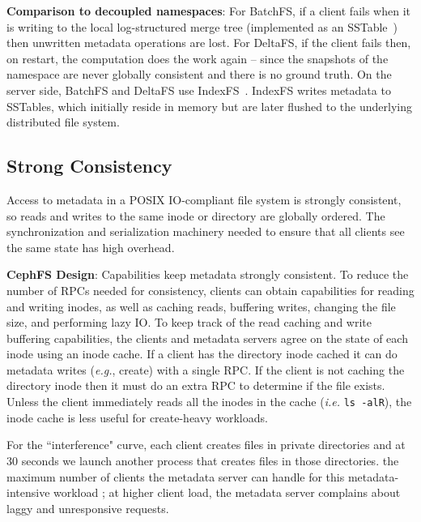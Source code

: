 \textbf{Comparison to decoupled namespaces}: For BatchFS, if a client fails
when it is writing to the local log-structured merge tree (implemented as an
SSTable~\cite{ren:atc2013-tablefs}) then unwritten metadata operations are
lost. For DeltaFS, if the client fails then, on restart, the computation does
the work again -- since the snapshots of the namespace are never globally
consistent and there is no ground truth.  On the server side, BatchFS and
DeltaFS use IndexFS~\cite{ren:sc2014-indexfs}. IndexFS writes metadata to
SSTables, which initially reside in memory but are later flushed to the
underlying distributed file system.

\subsection{Strong Consistency}
\label{sec:strong-consistency}

Access to metadata in a POSIX IO-compliant file system is strongly consistent, so
reads and writes to the same inode or directory are globally ordered.  The
synchronization and serialization machinery needed to ensure that all clients
see the same state has high overhead.


\textbf{CephFS Design}: Capabilities keep metadata strongly consistent. To
reduce the number of RPCs needed for consistency, clients can obtain
capabilities for reading and writing inodes, as well as caching reads,
buffering writes, changing the file size, and performing lazy IO.  To keep
track of the read caching and write buffering capabilities, the clients and
metadata servers agree on the state of each inode using an inode cache.  If a
client has the directory inode cached it can do metadata writes ({\it e.g.},
create) with a single RPC. If the client is not caching the directory inode
then it must do an extra RPC to determine if the file exists.  Unless the
client immediately reads all the inodes in the cache ({\it i.e.} \texttt{ls
-alR}), the inode cache is less useful for create-heavy workloads.

 For the ``interference"
curve, each client creates files in private directories and at 30 seconds we
launch another process that creates files in those directories.  the maximum number of
clients the metadata server can handle for this metadata-intensive workload
; at higher client load, the metadata server
complains about laggy and unresponsive requests.

